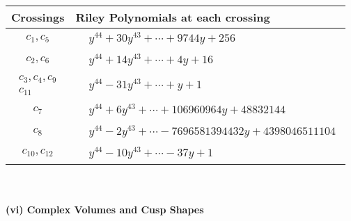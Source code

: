\documentclass[1p]{elsarticle_modified}
\theoremstyle{definition}
\begin{document}
\begin{tabular}{m{50pt}|m{274pt}}
Crossings & \hspace{64pt}Riley Polynomials at each crossing \\
\hline $$\begin{aligned}c_{1},c_{5}\end{aligned}$$&$\begin{aligned}
&y^{44}+30 y^{43}+\cdots+9744 y+256
\end{aligned}$\\
\hline $$\begin{aligned}c_{2},c_{6}\end{aligned}$$&$\begin{aligned}
&y^{44}+14 y^{43}+\cdots+4 y+16
\end{aligned}$\\
\hline $$\begin{aligned}c_{3},c_{4},c_{9}\\c_{11}\end{aligned}$$&$\begin{aligned}
&y^{44}-31 y^{43}+\cdots+y+1
\end{aligned}$\\
\hline $$\begin{aligned}c_{7}\end{aligned}$$&$\begin{aligned}
&y^{44}+6 y^{43}+\cdots+106960964 y+48832144
\end{aligned}$\\
\hline $$\begin{aligned}c_{8}\end{aligned}$$&$\begin{aligned}
&y^{44}-2 y^{43}+\cdots-7696581394432 y+4398046511104
\end{aligned}$\\
\hline $$\begin{aligned}c_{10},c_{12}\end{aligned}$$&$\begin{aligned}
&y^{44}-10 y^{43}+\cdots-37 y+1
\end{aligned}$\\
\hline
\end{tabular}\\~\\
\newpage\flushleft \textbf{(vi) Complex Volumes and Cusp Shapes}
\end{document}
